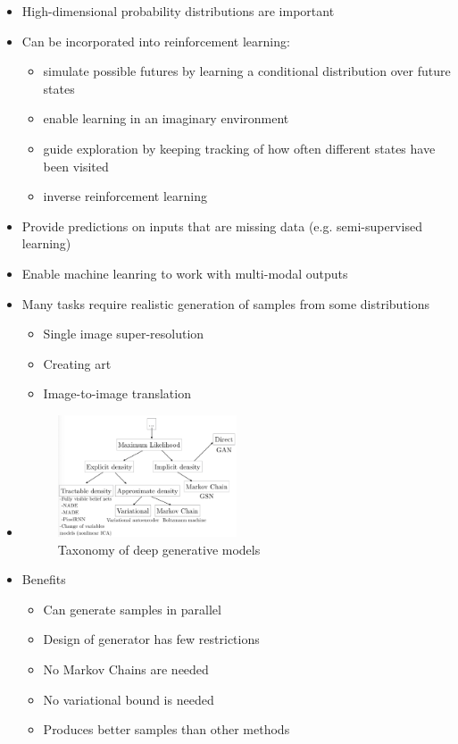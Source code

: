 \documentclass[../main.tex]{subfiles}
\begin{document}
\begin{itemize}
  \item High-dimensional probability distributions are important
  \item Can be incorporated into reinforcement learning:
  \begin{itemize}
    \item simulate possible futures by learning a conditional distribution over future states
    \item enable learning in an imaginary environment
    \item guide exploration by keeping tracking of how often different states have been visited
    \item inverse reinforcement learning
  \end{itemize}
  \item Provide predictions on inputs that are missing data (e.g. semi-supervised learning)
  \item Enable machine leanring to work with multi-modal outputs
  \item Many tasks require realistic generation of samples from some distributions
  \begin{itemize}
    \item Single image super-resolution
    \item Creating art
    \item Image-to-image translation
  \end{itemize}

  \item
  \begin{figure}[h]
    \caption{Taxonomy of deep generative models}
    \centering
    \includegraphics[width=0.5\textwidth]{../imgs/generative_models.png}
  \end{figure}

  \item Benefits
  \begin{itemize}
    \item Can generate samples in parallel
    \item Design of generator has few restrictions
    \item No Markov Chains are needed
    \item No variational bound is needed
    \item Produces better samples than other methods
  \end{itemize}

\end{itemize}
\end{document}
